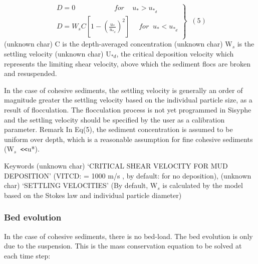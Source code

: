 \begin{equation*}
\left. 
\begin{array}{l}
D=0\qquad\qquad\quad\;\;for\quad\,u_* >u_{*_d} \;\;\, \\ 
D=W_s C\left[ 1-\left( \frac{u_*} {u_{*_d}} \right) ^{2} %
\right] \quad\;for\;\;u_* < u_{*_d}%
\end{array}
\right\} \;\;(5) 
\end{equation*}%
(unknown char)\hspace{5mm} C is the depth-averaged concentration \newline
(unknown char)\hspace{5mm} W$_{s}$ is the settling velocity\newline
(unknown char)\hspace{5mm} U$_{*d}$, the critical deposition velocity which
represents the limiting shear velocity, above which the sediment flocs are
broken and resuspended.

In the case of cohesive sediments, the settling velocity is generally an
order of magnitude greater the settling velocity based on the individual
particle size, as a result of flocculation.\newline
The flocculation process is not yet programmed in Sisyphe and the settling
velocity should be specified by the user as a calibration parameter. \newline
Remark \newline
In Eq(5), the sediment concentration is assumed to be uniform over depth,
which is a reasonable assumption for fine cohesive sediments (W$_{s}$\texttt{%
<}\texttt{<}u*).

Keywords\newline
(unknown char)\hspace{5mm} `CRITICAL SHEAR VELOCITY FOR MUD DEPOSITION'
(VITCD: = 1000 m/s , by default: for no deposition),\newline
(unknown char)\hspace{5mm} `SETTLING VELOCITIES' (By default, W$_{s}$ is
calculated by the model based on the Stokes law and individual particle
diameter)\newline

\subsubsection{Bed evolution}

In the case of cohesive sediments, there is no bed-load. The bed evolution
is only due to the suspension. This is the mass conservation equation to be
solved at each time step:

